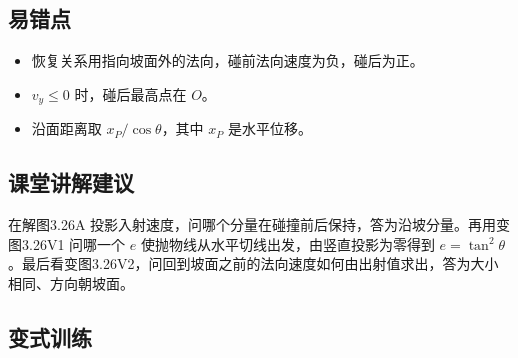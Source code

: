 \documentclass[UTF8,fontset=fandol,a4paper,11pt]{ctexart}
\begin{document}

\subsection*{易错点}

\begin{itemize}
\item 恢复关系用指向坡面外的法向，碰前法向速度为负，碰后为正。
\item $v_y\leq0$ 时，碰后最高点在 $O$。
\item 沿面距离取 $x_P/\cos\theta$，其中 $x_P$ 是水平位移。
\end{itemize}



\subsection*{课堂讲解建议}

在解图3.26A 投影入射速度，问哪个分量在碰撞前后保持，答为沿坡分量。再用变图3.26V1 问哪一个 $e$ 使抛物线从水平切线出发，由竖直投影为零得到 $e=\tan^2\theta$。最后看变图3.26V2，问回到坡面之前的法向速度如何由出射值求出，答为大小相同、方向朝坡面。



\subsection*{变式训练}
\end{document}
